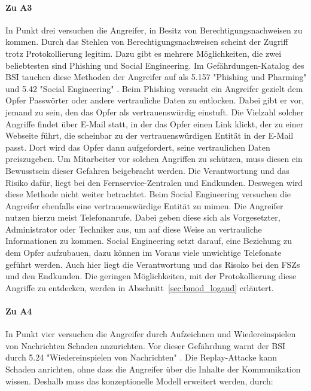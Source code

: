 \documentclass[11pt,a4paper]{report}
\begin{document}
\paragraph{Zu A3} In Punkt drei versuchen die Angreifer, in Besitz von Berechtigungsnachweisen zu kommen. Durch das Stehlen von Berechtigungsnachweisen scheint der Zugriff trotz Protokollierung legitim. Dazu gibt es mehrere Möglichkeiten, die zwei beliebtesten sind Phishing und Social Engineering. Im Gefährdungen-Katalog des BSI tauchen diese Methoden der Angreifer auf als 5.157 "Phishing und Pharming" und 5.42 "Social Engineering" \cite{bsi_g5157, bsi_g5042}. Beim Phishing versucht ein Angreifer gezielt dem Opfer Passwörter oder andere vertrauliche Daten zu entlocken. Dabei gibt er vor, jemand zu sein, den das Opfer als vertrauenswürdig einstuft. Die Vielzahl solcher Angriffe findet über E-Mail statt, in der das Opfer einen Link klickt, der zu einer Webseite führt, die scheinbar zu der vertrauenswürdigen Entität in der E-Mail passt. Dort wird das Opfer dann aufgefordert, seine vertraulichen Daten preiszugeben. Um Mitarbeiter vor solchen Angriffen zu schützen, muss diesen ein Bewusstsein dieser Gefahren beigebracht werden. Die Verantwortung und das Risiko dafür, liegt bei den Fernservice-Zentralen und Endkunden. Deswegen wird diese Methode nicht weiter betrachtet. Beim Social Engineering versuchen die Angreifer ebenfalls eine vertrauenswürdige Entität zu mimen. Die Angreifer nutzen hierzu meist Telefonanrufe. Dabei geben diese sich als Vorgesetzter, Administrator oder Techniker aus, um auf diese Weise an vertrauliche Informationen zu kommen. Social Engineering setzt darauf, eine Beziehung zu dem Opfer aufzubauen, dazu können im Voraus viele unwichtige Telefonate geführt werden. Auch hier liegt die Verantwortung und das Risoko bei den FSZs und den Endkunden. Die geringen Möglichkeiten, mit der Protokollierung diese Angriffe zu entdecken, werden in Abschnitt~\ref{sec:bmod_logaud} erläutert.

\paragraph{Zu A4} In Punkt vier versuchen die Angreifer durch Aufzeichnen und Wiedereinspielen von Nachrichten Schaden anzurichten. Vor dieser Gefährdung warnt der BSI durch 5.24 "Wiedereinspielen von Nachrichten" \cite{bsi_g5024}. Die Replay-Attacke kann Schaden anrichten, ohne dass die Angreifer über die Inhalte der Kommunikation wissen. Deshalb muss das konzeptionelle Modell erweitert werden, durch:
\end{document}
